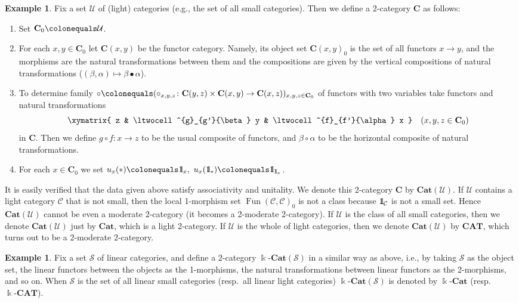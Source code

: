 \documentclass{surv-l}
\numberwithin{equation}{chapter}
\numberwithin{figure}{chapter}
\theoremstyle{plain}
\theoremstyle{definition}
\newtheorem{exm}[thm]{Example}
\theoremstyle{remark}
\newcommand{\id}{1\kern-.25em{\text{{\rm l}}}}
\newcommand{\kCAT}{\Bbbk\text{-}\mathbf{CAT}}
\newcommand{\kCat}{\Bbbk\text{-}\mathbf{Cat}}
\DeclareMathOperator{\Fun}{Fun}
\begin{document}
\begin{exm}\label{exm:Cat}
Fix a set $\mathcal{U}$ of (light) categories (e.g., the set of all small categories).
Then we define a $2$-category $\mathbf{C}$ as follows:
\begin{enumerate}
\item
Set $\mathbf{C}_0\colonequals  \mathcal{U}$.
\item
For each $x, y \in \mathbf{C}_0$ let
$\mathbf{C}(x,y)$ be the functor category.
Namely, its object set $\mathbf{C}(x, y)_0$ is the set of all functors $x \to y$,
and the morphisms are the natural transformations between them and
the compositions are given by the vertical compositions of natural transformations
($(\beta, \alpha) \mapsto \beta \bullet \alpha$).
\item
To determine family $\circ\colonequals  (\circ_{x,y,z} \colon \mathbf{C}(y, z)\times \mathbf{C}(x,y) \to \mathbf{C}(x,z))_{x,y,z \in \mathbf{C}_0}$  of functors with two variables take
functors and natural transformations
\[
\xymatrix{
z & \ltwocell^{g}_{g'}{\beta} y & \ltwocell^{f}_{f'}{\alpha} x
}\quad (x, y, z \in \mathbf{C}_0)
\]
in $\mathbf{C}$. Then we define $g\circ f \colon x \to z$ to be the usual composite of functors,
and
$\beta \circ \alpha$ to be the horizontal composite of natural transformations.
\item
For each $x \in \mathbf{C}_0$ we set $u_x(*)\colonequals  \id_x,\ u_x(\id_*)\colonequals  \id_{\id_x}$.
\end{enumerate}
It is easily verified that the data given above
satisfy associativity and unitality.
We denote this 2-category $\mathbf{C}$ by
$\mathbf{Cat}(\mathcal{U})$.
If $\mathcal{U}$ contains a light category ${\mathcal{C}}$ that is not small,
then the local 1-morphism set $\Fun({\mathcal{C}}, {\mathcal{C}})_0$ is not a class because
$\id_{\mathcal{C}}$ is not a small set.
Hence $\mathbf{Cat}(\mathcal{U})$ cannot be even a moderate $2$-category
(it becomes a 2-moderate 2-category).
If $\mathcal{U}$ is the class of all small categories, then
we denote $\mathbf{Cat}(\mathcal{U})$ just by $\mathbf{Cat}$, which is a light 2-category.
If $\mathcal{U}$ is the whole of light categories, then
we denote $\mathbf{Cat}(\mathcal{U})$ by $\mathbf{CAT}$, which turns out to be
a 2-moderate 2-category.
\end{exm}

\begin{exm}\label{exm:k-Cat}
Fix a set $\mathcal{S}$ of linear categories, and define
a 2-category $\kCat(\mathcal{S})$ in a similar way as above, i.e.,
by taking $\mathcal{S}$ as the object set,
the linear functors between the objects as the 1-morphisms,
the natural transformations between linear functors as the 2-morphisms,
and so on.
When $\mathcal{S}$ is the set of all linear small categories
(resp.\ all linear light categories) $\kCat(\mathcal{S})$ is denoted by
$\kCat$ (resp.\ $\kCAT$).
\end{exm}
\end{document}
